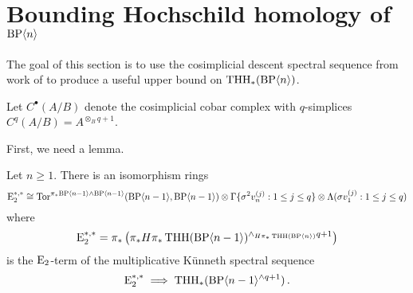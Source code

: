 \section{Bounding Hochschild homology of $\mathrm{BP}\langle n\rangle$}
The goal of this section is to use the cosimplicial descent spectral sequence from work of \cite{DR18} to produce a useful upper bound on $\operatorname{THH}_{*}(\mathrm{BP}\langle n\rangle)$. 
\begin{definition}
Let $C^{\bullet}(A/B)$ denote the cosimplicial cobar complex with $q$-simplices $C^{q}(A/B)=A^{\otimes_{B}q+1}$.
\end{definition}

First, we need a lemma. 

\begin{lemma}\label{cobar lemma}
Let $n\ge 1$. There is an isomorphism rings
\[\mathrm{E}_{2}^{*,*}\cong \operatorname{Tor}^{\pi_{*}\mathrm{BP}\langle n-1\rangle \wedge \mathrm{BP}\langle n-1\rangle }(\mathrm{BP} \langle n-1\rangle,\mathrm{BP} \langle n-1\rangle)\otimes \Gamma \{ \sigma^{2}v_{n}^{(j)}: 1\le j\le q\}\otimes \Lambda (\sigma v_{1}^{(j)} : 1\le j\le q ) 
\]
where 
\[\mathrm{E}_{2}^{*,*}=\pi_{*}\left ( \pi_{*}H\pi_{*}\operatorname{THH}(\mathrm{BP}\langle n-1\rangle)^{\wedge_{H\pi_{*}\operatorname{THH}(\mathrm{BP}\langle n\rangle)}q+1} \right )\]
is the $\mathrm{E}_{2}$-term of the multiplicative K\"unneth spectral sequence
\[ \mathrm{E}_{2}^{*,*}\implies \operatorname{THH}_{*}(\mathrm{BP}\langle n-1\rangle^{\wedge q+1})\,.\]
\end{lemma}
